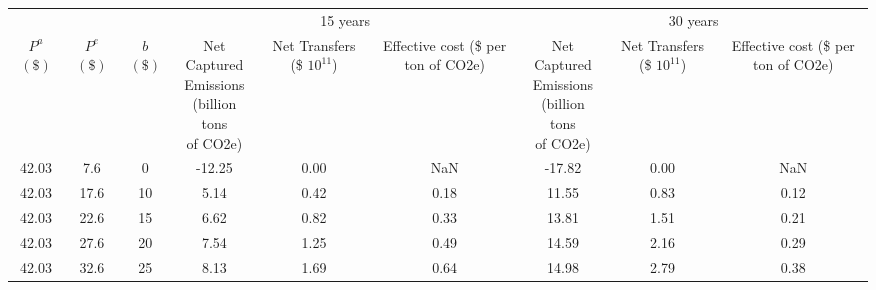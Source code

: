 
\begin{tabular}[t]{ccccccccc}
\toprule

&&& \multicolumn{3}{c}{15 years} & \multicolumn{3}{c}{30 years} \\
\cmidrule[1pt](r){4-6} \cmidrule[1pt](r){7-9} 
\makecell[c]{$P^a$ \\ $(\$)$} & \makecell[c]{$P^e$ \\ $(\$)$} & \makecell[c]{$b$ \\ $(\$)$} & \makecell[c]{Net Captured \\ Emissions \\ (billion tons \\ of CO2e)} & \makecell[c]{Net Transfers \\ (\$ $10^{11}$)} & \makecell[c]{Effective cost \\ (\$ per ton \\ of CO2e)} &
\makecell[c]{Net Captured \\ Emissions \\ (billion tons \\ of CO2e)} & \makecell[c]{Net Transfers \\ (\$ $10^{11}$)} & \makecell[c]{Effective cost \\ (\$ per ton \\ of CO2e)}\\
\midrule

42.03 &  7.6 &  0 & -12.25 &   0.00 &       NaN & -17.82 &   0.00 &       NaN \\
42.03 & 17.6 & 10 &   5.14 &   0.42 &  0.18 &  11.55 &   0.83 &  0.12 \\
42.03 & 22.6 & 15 &   6.62 &   0.82 &  0.33 &  13.81 &   1.51 &  0.21 \\
42.03 & 27.6 & 20 &   7.54 &   1.25 &  0.49 &  14.59 &   2.16 &  0.29 \\
42.03 & 32.6 & 25 &   8.13 &   1.69 &  0.64 &  14.98 &   2.79 &  0.38 \\



\bottomrule
\end{tabular}
